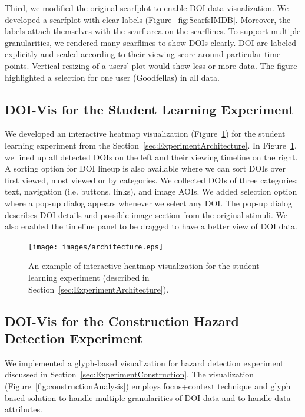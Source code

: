 Third, we modified the original scarfplot to enable DOI data visualization. We developed a scarfplot with clear labels (Figure~\ref{fig:ScarfsIMDB}. Moreover, the labels attach themselves with the scarf area on the scarflines. To support multiple granularities, we rendered many scarflines to show DOIs clearly. DOI are labeled explicitly and scaled according to their viewing-score around particular time-points. Vertical resizing of a users' plot would show less or more data. The figure highlighted a selection for one user (Goodfellas) in all data. 

\subsection{DOI-Vis for the Student Learning Experiment}
We developed an interactive heatmap visualization (Figure~\ref{fig:HeatmapArchitecture}) for the student learning experiment from the Section~\ref{sec:ExperimentArchitecture}. In Figure~\ref{fig:HeatmapArchitecture}, we lined up all detected DOIs on the left and their viewing timeline on the right. A sorting option for DOI lineup is also available where we can sort DOIs over first viewed, most viewed or by categories. We collected DOIs of three categories: text, navigation (i.e. buttons, links), and image AOIs. We added selection option where a pop-up dialog appears whenever we select any DOI. The pop-up dialog describes DOI details and possible image section from the original stimuli. We also enabled the timeline panel to be dragged to have a better view of DOI data. 
\begin{figure}
  \centering
  \texttt{[image: images/architecture.eps]}
  \caption{An example of interactive heatmap visualization for the student learning experiment (described in Section~\ref{sec:ExperimentArchitecture}). }
	\label{fig:HeatmapArchitecture}
\end{figure}

\subsection{DOI-Vis for the Construction Hazard Detection Experiment}
We implemented a glyph-based visualization for hazard detection experiment discussed in Section~\ref{sec:ExperimentConstruction}. The visualization (Figure~\ref{fig:constructionAnalysis}) employs focus+context technique and glyph based solution to handle multiple granularities of DOI data and to handle data attributes. 

